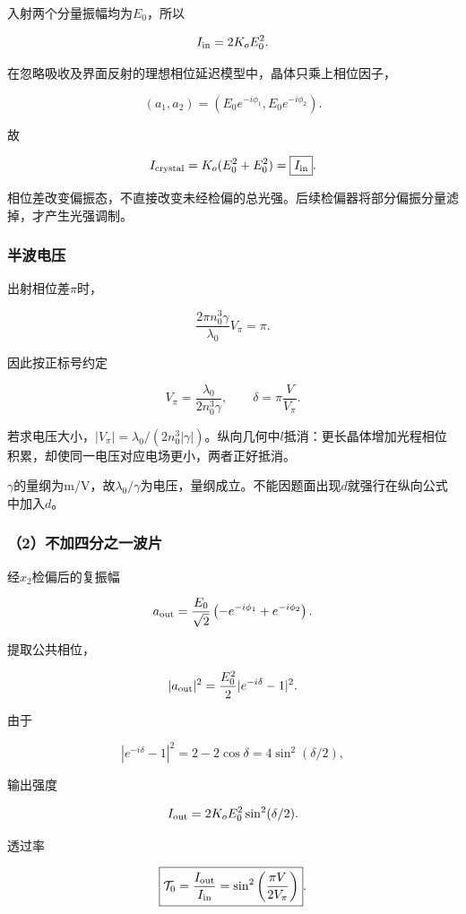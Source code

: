 \documentclass[12pt,a4paper,fontset=fandol]{ctexart}
\begin{document}
入射两个分量振幅均为\(E_0\)，所以

\[
I_{\rm in}=2K_oE_0^2.
\]

在忽略吸收及界面反射的理想相位延迟模型中，晶体只乘上相位因子，

\[
(a_1,a_2)
=(E_0e^{-i\phi_1},E_0e^{-i\phi_2}).
\]

故

\[
I_{\rm crystal}
=K_o(E_0^2+E_0^2)
=\boxed{I_{\rm in}}.
\]

相位差改变偏振态，不直接改变未经检偏的总光强。后续检偏器将部分偏振分量滤掉，才产生光强调制。

\subsubsection{半波电压}\label{ux534aux6ce2ux7535ux538b}

出射相位差\(\pi\)时，

\[
\frac{2\pi n_0^3\gamma}{\lambda_0}V_\pi=\pi.
\]

因此按正标号约定

\[
\boxed{V_\pi=\frac{\lambda_0}{2n_0^3\gamma}},
\qquad
\boxed{\delta=\pi\frac V{V_\pi}}.
\]

若求电压大小，\(|V_\pi|=\lambda_0/(2n_0^3|\gamma|)\)。纵向几何中\(l\)抵消：更长晶体增加光程相位积累，却使同一电压对应电场更小，两者正好抵消。

\(\gamma\)的量纲为m/V，故\(\lambda_0/\gamma\)为电压，量纲成立。不能因题面出现\(d\)就强行在纵向公式中加入\(d\)。

\subsubsection{（2）不加四分之一波片}\label{ux4e0dux52a0ux56dbux5206ux4e4bux4e00ux6ce2ux7247}

经\(x_2\)检偏后的复振幅

\[
a_{\rm out}
=\frac{E_0}{\sqrt2}
\left(-e^{-i\phi_1}+e^{-i\phi_2}\right).
\]

提取公共相位，

\[
|a_{\rm out}|^2
=\frac{E_0^2}{2}|e^{-i\delta}-1|^2.
\]

由于

\[
|e^{-i\delta}-1|^2=2-2\cos\delta
=4\sin^2(\delta/2),
\]

输出强度

\[
I_{\rm out}=2K_oE_0^2\sin^2(\delta/2).
\]

透过率

\[
\boxed{
\mathcal T_0=\frac{I_{\rm out}}{I_{\rm in}}
=\sin^2\left(\frac{\pi V}{2V_\pi}\right)}.
\]
\end{document}
